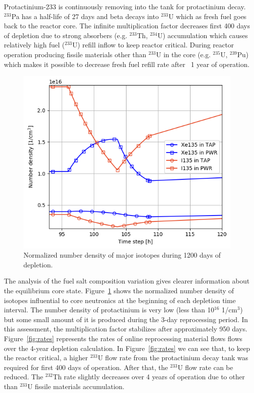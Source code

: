 \documentclass{anstrans}
\begin{document}
\FloatBarrier

Protactinium-233 is continuously removing into the tank for protactinium decay.  $^{233}$Pa has a half-life of 27 days and 
beta decays into $^{233}$U which as fresh fuel goes back to the reactor core. 
The infinite multiplication factor decreases first 400 days of depletion due to 
strong absorbers (e.g. $^{233}$Th, $^{234}$U) accumulation which causes 
relatively high fuel ($^{233}$U) refill inflow to keep reactor critical. During 
reactor operation producing fissile materials other than $^{233}$U in the core 
(e.g. $^{235}$U, $^{239}$Pu) which makes it possible to decrease fresh fuel 
refill rate after ~1 year of operation.

\begin{figure}[htbp!] %
        \centering
        \includegraphics[width=1.05\linewidth]{tap_vs_pwr_xe_i_density.png}
        \caption{Normalized number density of major isotopes during 1200 days of 
        depletion.}
        \label{fig:compos}
\end{figure}

\FloatBarrier

The analysis of the fuel salt composition variation gives clearer information 
about the equilibrium core state. Figure~\ref{fig:compos} shows the normalized 
number density of isotopes influential to core 
neutronics at the beginning of each depletion time interval. The number density 
of protactinium is very low (less than 10$^{16}$ 1/cm$^3$) but some small amount 
of it is produced during the 3-day reprocessing period. In this assessment, the multiplication 
factor stabilizes after approximately 950 days. 
Figure~\ref{fig:rates} represents the rates of online reprocessing material flows
flows over the 4-year depletion calculation. 
In Figure~\ref{fig:rates} we can see that, to keep the reactor critical, a 
higher $^{233}$U 
flow rate from the protactinium decay tank was required for first 400 days of 
operation. After that, the $^{233}$U flow rate can be reduced. The $^{232}$Th 
rate slightly decreases over 4 years of operation due to other than $^{233}$U 
fissile materials accumulation.
\end{document}
